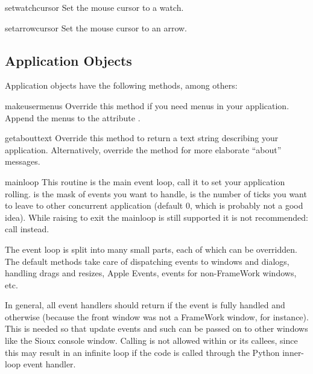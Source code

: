 \begin{funcdesc}{setwatchcursor}{}
Set the mouse cursor to a watch.
\end{funcdesc}

\begin{funcdesc}{setarrowcursor}{}
Set the mouse cursor to an arrow.
\end{funcdesc}


\subsection{Application Objects \label{application-objects}}

Application objects have the following methods, among others:


\begin{methoddesc}[Application]{makeusermenus}{}
Override this method if you need menus in your application. Append the
menus to the attribute .
\end{methoddesc}

\begin{methoddesc}[Application]{getabouttext}{}
Override this method to return a text string describing your
application.  Alternatively, override the  method
for more elaborate ``about'' messages.
\end{methoddesc}

\begin{methoddesc}[Application]{mainloop}{}
This routine is the main event loop, call it to set your application
rolling.  is the mask of events you want to handle,
 is the number of ticks you want to leave to other
concurrent application (default 0, which is probably not a good
idea). While raising  to exit the mainloop is still
supported it is not recommended: call  instead.

The event loop is split into many small parts, each of which can be
overridden. The default methods take care of dispatching events to
windows and dialogs, handling drags and resizes, Apple Events, events
for non-FrameWork windows, etc.

In general, all event handlers should return  if the event is fully
handled and  otherwise (because the front window was not a FrameWork
window, for instance). This is needed so that update events and such
can be passed on to other windows like the Sioux console window.
Calling  is not allowed within
 or its callees, since this may result in an
infinite loop if the code is called through the Python inner-loop
event handler.
\end{methoddesc}

